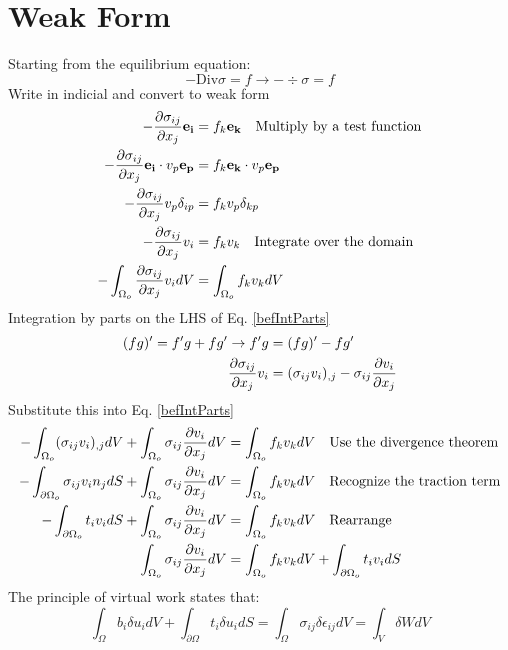 \documentclass[12pt,3p]{article}
\begin{document}
\section{Weak Form}
Starting from the equilibrium equation:
\begin{equation}
- \text{Div} \sigma = f \rightarrow - \div \sigma = f 
\end{equation}
Write in indicial and convert to weak form 
\begin{align}\label{befIntParts}
\begin{split}
- \pdv{\sigma_{ij}}{x_j} \mathbf{e_i} &= f_k \mathbf{e_k} \quad \text{Multiply by a test function} \\
-\pdv{\sigma_{ij}}{x_j} \mathbf{e_i} \cdot v_p \mathbf{e_p} &= f_k \mathbf{e_k} \cdot v_p \mathbf{e_p} \\
-\pdv{\sigma_{ij}}{x_j} v_p \delta_{ip} &= f_k v_p \delta_{kp} \\
-\pdv{\sigma_{ij}}{x_j} v_i &= f_k v_k \quad \text{Integrate over the domain} \\
-\int_{\Omega_o} \pdv{\sigma_{ij}}{x_j} v_i dV &= \int_{\Omega_o} f_k v_k dV
\end{split}
\end{align}
Integration by parts on the LHS of Eq. \ref{befIntParts}
\begin{align*}
(fg)' = f'g + fg' \rightarrow f'g &= (fg)' - fg' \\
\pdv{\sigma_{ij}}{x_j} v_i &= (\sigma_{ij} v_i)_{,j} - \sigma_{ij} \pdv{v_i}{x_j}
\end{align*}
Substitute this into Eq. \ref{befIntParts}
\begin{align*}
-\int_{\Omega_o}  (\sigma_{ij} v_i)_{,j} dV + \int_{\Omega_o} \sigma_{ij} \pdv{v_i}{x_j} dV &= \int_{\Omega_o} f_k v_k dV \quad \text{Use the divergence theorem} \\
-\int_{\partial \Omega_o} \sigma_{ij} v_i n_j dS + \int_{\Omega_o} \sigma_{ij} \pdv{v_i}{x_j} dV &= \int_{\Omega_o} f_k v_k dV \quad \text{Recognize the traction term} \\
-\int_{\partial \Omega_o} t_i v_i dS + \int_{\Omega_o} \sigma_{ij} \pdv{v_i}{x_j} dV &= \int_{\Omega_o} f_k v_k dV \quad \text{Rearrange}\\
 \int_{\Omega_o} \sigma_{ij} \pdv{v_i}{x_j}  dV &= \int_{\Omega_o} f_k v_k dV + \int_{\partial \Omega_o} t_i v_i dS
\end{align*}
The principle of virtual work states that:
\begin{equation}\label{PVW}
\int_{\Omega} b_i \delta u_i dV + \int_{\partial \Omega} t_i \delta u_i dS  = \int_{\Omega} \sigma_{ij} \delta \epsilon_{ij} dV = \int_{V} \delta W dV
\end{equation}
\end{document}
